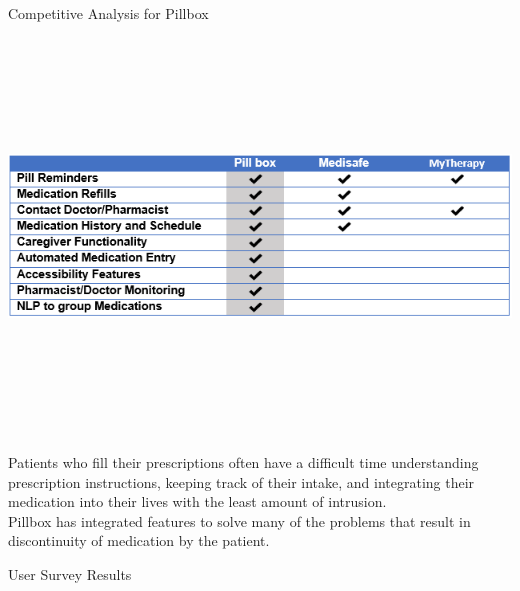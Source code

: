 \documentclass[22pt]{beamer}
\begin{document}
\begin{frame}[fragile]
\begin{textblock}{7.25}
\begin{block}{Competitive Analysis for Pillbox}
\begin{center}
\includegraphics[height=10.5cm]{CompetitiveAdvantage.png}
\end{center}
Patients who fill their prescriptions often have a difficult time understanding prescription instructions, keeping track of their intake, and integrating their medication into their lives with the least amount of intrusion.\\
Pillbox has integrated features to solve many of the problems that result in discontinuity of medication by the patient.
\end{block}

\begin{block}{User Survey Results}


\end{block}
\end{textblock}
\end{frame}
\end{document}
